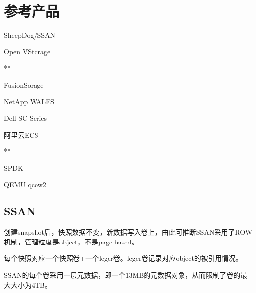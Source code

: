 \section{参考产品}

\begin{enumbox}
\item SheepDog/SSAN
\item Open VStorage
\item ***
\item FusionSorage
\item NetApp WALFS
\item Dell SC Series
\item 阿里云ECS
\item ***
\item SPDK
\item QEMU qcow2
\end{enumbox}

\subsection{SSAN}

创建snapshot后，快照数据不变，新数据写入卷上，由此可推断SSAN采用了ROW机制，管理粒度是object，不是page-based。

每个快照对应一个快照卷+一个leger卷。leger卷记录对应object的被引用情况。

SSAN的每个卷采用一层元数据，即一个13MB的元数据对象，从而限制了卷的最大大小为4TB。
